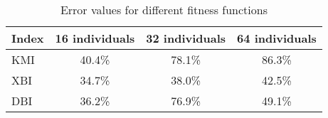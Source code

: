\documentclass[11pt,leqno]{article}
\theoremstyle{mytheoremstyle}
\theoremstyle{mytheoremstyle}
\begin{document}
\begin{table}[h]
\begin{center}
\begin{tabular}{l|c|c|c|}
\textbf{Index}& \textbf{16 individuals} & \textbf{32 individuals} & \textbf{64 individuals} \\
\hline
KMI & 40.4\% & 78.1\% & 86.3\% \\
\hline
XBI & 34.7\% & 38.0\% & 42.5\% \\
\hline
DBI & 36.2\% & 76.9\% & 49.1\% \\
\hline
\end{tabular}
\caption{Error values for different fitness functions}
\end{center}
\end{table}
\end{document}

